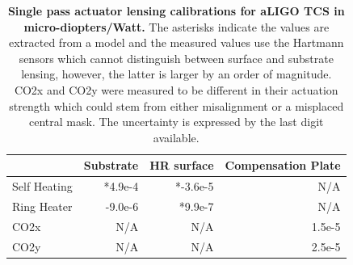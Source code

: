 		\begin{table}[]
		\centering
		\begin{tabular}{|l||r|r|r|}
			\hline
			\hline
			& \multicolumn{1}{c|}{Substrate} & \multicolumn{1}{c|}{HR surface} & \multicolumn{1}{c|}{Compensation Plate} \\ \hline
			Self Heating & *4.9e-4                       & *-3.6e-5                        & N/A                                     \\ \hline
			Ring Heater  & -9.0e-6                       & *9.9e-7                         & N/A                                     \\ \hline
			CO2x         & N/A                            & N/A                             & 1.5e-5                                  \\ \hline
			CO2y         & N/A                            & N/A                             & 2.5e-5                                  \\ \hline
		\end{tabular}
		\caption[Single pass actuator lensing calibrations for aLIGO TCS in micro-diopters/Watt.] 
		{\textbf{Single pass actuator lensing calibrations for aLIGO TCS in micro-diopters/Watt.} The asterisks indicate the values are extracted from a model and the measured values use the Hartmann sensors which cannot distinguish between surface and substrate lensing, however, the latter is larger by an order of magnitude.  CO2x and CO2y were measured to be different in their actuation strength which could stem from either misalignment or a misplaced central mask.  The uncertainty is expressed by the last digit available.
		}
		\label{tbl:Actuaor_calibs}
	\end{table}
	
